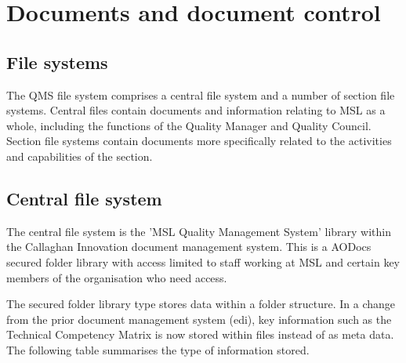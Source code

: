 \section{Documents and document control}
\label{s:documents_and_document_control}
\subsection{File systems}
The QMS file system comprises a central file system and a number of section file systems. Central files contain documents and information relating to MSL as a whole, including the functions of the Quality Manager and Quality Council.  Section file systems contain documents more specifically related to the activities and capabilities of the section.

\subsection{Central file system}
\label{ss:central_file_system}
The central file system is the 'MSL Quality Management System' library within the Callaghan Innovation document management system. This is a AODocs secured folder library with access limited to staff working at MSL and certain key members of the organisation who need access.

The secured folder library type stores data within a folder structure.  In a change from the prior document management system (edi), key information such as the Technical Competency Matrix is now stored within files instead of as meta data.  The following table summarises the type of information stored.

